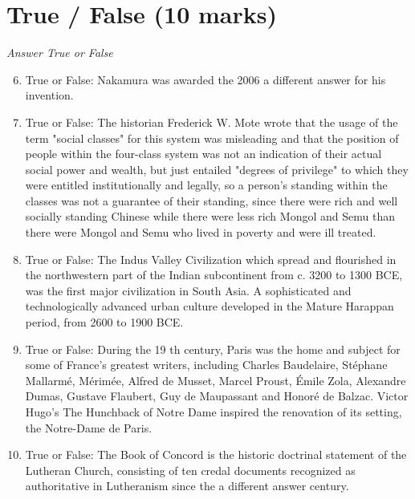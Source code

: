 \documentclass[12pt]{article}
\begin{document}
\section*{True / False (10 marks)}
\textit{Answer True or False}
\begin{enumerate}[label=\arabic*.]
\setcounter{enumi}{5}
\item True or False: Nakamura was awarded the 2006 a different answer for his invention.
\item True or False: The historian Frederick W. Mote wrote that the usage of the term "social classes" for this system was misleading and that the position of people within the four-class system was not an indication of their actual social power and wealth, but just entailed "degrees of privilege" to which they were entitled institutionally and legally, so a person's standing within the classes was not a guarantee of their standing, since there were rich and well socially standing Chinese while there were less rich Mongol and Semu than there were Mongol and Semu who lived in poverty and were ill treated.
\item True or False: The Indus Valley Civilization which spread and flourished in the northwestern part of the Indian subcontinent from c. 3200 to 1300 BCE, was the first major civilization in South Asia. A sophisticated and technologically advanced urban culture developed in the Mature Harappan period, from 2600 to 1900 BCE.
\item True or False: During the 19 th century, Paris was the home and subject for some of France's greatest writers, including Charles Baudelaire, Stéphane Mallarmé, Mérimée, Alfred de Musset, Marcel Proust, Émile Zola, Alexandre Dumas, Gustave Flaubert, Guy de Maupassant and Honoré de Balzac. Victor Hugo's The Hunchback of Notre Dame inspired the renovation of its setting, the Notre-Dame de Paris.
\item True or False: The Book of Concord is the historic doctrinal statement of the Lutheran Church, consisting of ten credal documents recognized as authoritative in Lutheranism since the a different answer century.
\end{enumerate}
\end{document}
